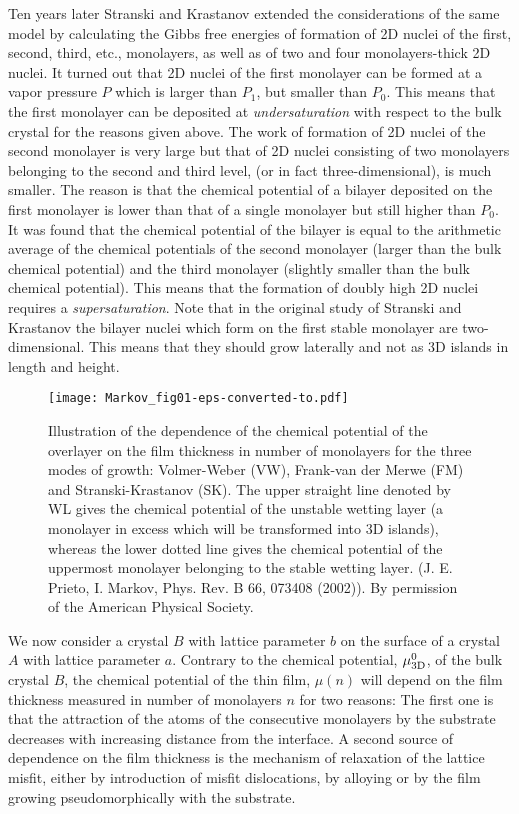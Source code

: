 \documentclass[aps,prl,showpacs,twocolumn,byrevtex,floatfix]{revtex4-1}
\begin{document}
Ten years later Stranski and Krastanov extended the considerations of the same
model by calculating the Gibbs free energies of formation of 2D nuclei of the
first, second, third, etc., monolayers, as well as of two and four 
monolayers-thick
2D nuclei.\cite{Stranski39} It turned out that 2D nuclei of the first monolayer
can be formed at a vapor pressure $P$ which is larger than $P_1$, but smaller
than $P_0$. This means that the first monolayer can be deposited at {\it
undersaturation} with respect to the bulk crystal for the reasons given above. 
The work of formation of 2D nuclei of the second monolayer is very large 
but that of
2D nuclei consisting of two monolayers belonging to the second and third level,
(or in fact three-dimensional), is much smaller. The reason is that the chemical
potential of a bilayer deposited on the first monolayer is lower than that of a
single monolayer but still higher than $P_0$. It was found that the chemical
potential of the bilayer is equal to the arithmetic average of the chemical
potentials of the second monolayer (larger than the bulk chemical potential)
and the third monolayer (slightly smaller than the bulk chemical potential).
This means that the formation of doubly high 2D nuclei requires a {\it
supersaturation}. Note that in the original study of Stranski and Krastanov the
bilayer nuclei which form on the first stable monolayer are two-dimensional.
This means that they should grow laterally and not as 3D islands in length and
height.\cite{Kaischew81}


\begin{figure}[h]
\texttt{[image: Markov\_fig01-eps-converted-to.pdf]}
\caption{\label{tdf} Illustration of the dependence of the chemical potential
of the overlayer on the film thickness in number of monolayers for the three
modes of growth: Volmer-Weber (VW), Frank-van der Merwe (FM) and
Stranski-Krastanov (SK). The upper straight line denoted by WL gives the
chemical potential of the unstable wetting layer (a monolayer in excess which
will be transformed into 3D islands), whereas the lower dotted line gives the
chemical potential of the uppermost monolayer belonging to the stable wetting
layer. (J. E. Prieto, I. Markov, Phys. Rev. B 66, 073408 (2002)). By
permission of the American Physical Society.}
\end{figure}



We now consider a crystal $B$ with lattice parameter $b$ on the surface of a
crystal $A$ with lattice parameter $a$. Contrary to the chemical potential,
$\mu^0_{\rm 3D}$, of the bulk crystal $B$, the chemical potential of the thin
film, $\mu (n)$ will depend on the film thickness measured in number of
monolayers $n$ for two reasons: The first one is that the attraction of the
atoms of the consecutive monolayers by the substrate decreases with
increasing distance from the interface. A second source of dependence on the
film thickness is the mechanism of relaxation of the lattice misfit, either by
introduction of misfit dislocations, by alloying or by the film growing
pseudomorphically with the substrate.
\end{document}
